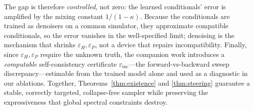 \noindent The gap is therefore \emph{controlled}, not zero: the learned conditionals' error is
amplified by the mixing constant $1/(1-\kappa)$. Because the conditionals are trained as denoisers on
a common simulator, they approximate compatible conditionals, so the error vanishes in the
well-specified limit; denoising is the mechanism that shrinks $\varepsilon_H,\varepsilon_P$, not a
device that repairs incompatibility. Finally, since $\varepsilon_H,\varepsilon_P$ require the unknown
truth, the companion work introduces a \emph{computable} self-consistency certificate
$\varepsilon_{\mathrm{inc}}$---the forward-vs-backward sweep discrepancy---estimable from the trained
model alone and used as a diagnostic in our ablations. Together, Theorems~\ref{thm:existence} and
\ref{thm:steering} guarantee a stable, correctly targeted, collapse-free sampler while preserving the
expressiveness that global spectral constraints destroy.
